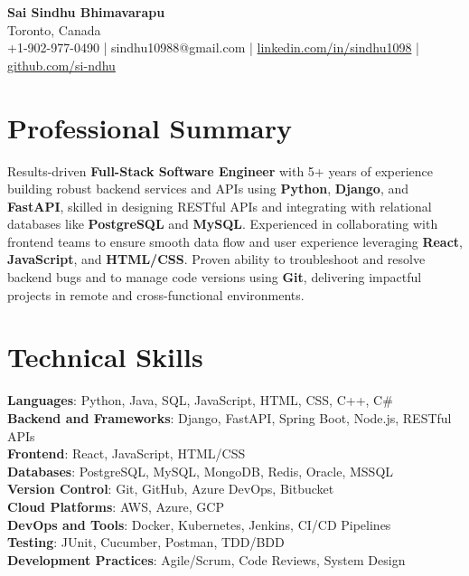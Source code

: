 \documentclass[letterpaper,11pt]{article}
\begin{document}
\begin{center}
  {\Large \textbf{Sai Sindhu Bhimavarapu}} \\
  Toronto, Canada \\
  +1-902-977-0490 \enspace | \enspace sindhu10988@gmail.com \enspace | \enspace \href{https://www.linkedin.com/in/sindhu1098/}{linkedin.com/in/sindhu1098} \enspace | \enspace \href{https://github.com/si-ndhu}{github.com/si-ndhu}
\end{center}

\section{Professional Summary}
  \begin{itemize}[leftmargin=0.15in, label={}]
    \small{\item{
     Results-driven \textbf{Full-Stack Software Engineer} with 5+ years of experience building robust backend services and APIs using \textbf{Python}, \textbf{Django}, and \textbf{FastAPI}, skilled in designing RESTful APIs and integrating with relational databases like \textbf{PostgreSQL} and \textbf{MySQL}. Experienced in collaborating with frontend teams to ensure smooth data flow and user experience leveraging \textbf{React}, \textbf{JavaScript}, and \textbf{HTML/CSS}. Proven ability to troubleshoot and resolve backend bugs and to manage code versions using \textbf{Git}, delivering impactful projects in remote and cross-functional environments.
    }}
  \end{itemize}
\vspace{-16pt}

\section{Technical Skills}
 \begin{itemize}[leftmargin=0.15in, label={}]
    \small{\item{
     \textbf{Languages}: Python, Java, SQL, JavaScript, HTML, CSS, C++, C\# \\
     \textbf{Backend and Frameworks}: Django, FastAPI, Spring Boot, Node.js, RESTful APIs \\
     \textbf{Frontend}: React, JavaScript, HTML/CSS \\
     \textbf{Databases}: PostgreSQL, MySQL, MongoDB, Redis, Oracle, MSSQL \\
     \textbf{Version Control}: Git, GitHub, Azure DevOps, Bitbucket \\
     \textbf{Cloud Platforms}: AWS, Azure, GCP \\
     \textbf{DevOps and Tools}: Docker, Kubernetes, Jenkins, CI/CD Pipelines \\
     \textbf{Testing}: JUnit, Cucumber, Postman, TDD/BDD \\
     \textbf{Development Practices}: Agile/Scrum, Code Reviews, System Design
    }}
 \end{itemize}
\vspace{-16pt}
\end{document}
